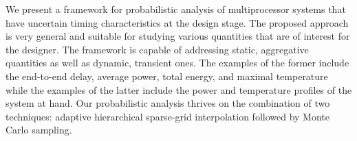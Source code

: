 We present a framework for probabilistic analysis of multiprocessor systems that
have uncertain timing characteristics at the design stage. The proposed approach
is very general and suitable for studying various quantities that are of
interest for the designer. The framework is capable of addressing static,
aggregative quantities as well as dynamic, transient ones. The examples of the
former include the end-to-end delay, average power, total energy, and maximal
temperature while the examples of the latter include the power and temperature
profiles of the system at hand. Our probabilistic analysis thrives on the
combination of two techniques: adaptive hierarchical sparse-grid interpolation
followed by Monte Carlo sampling.
